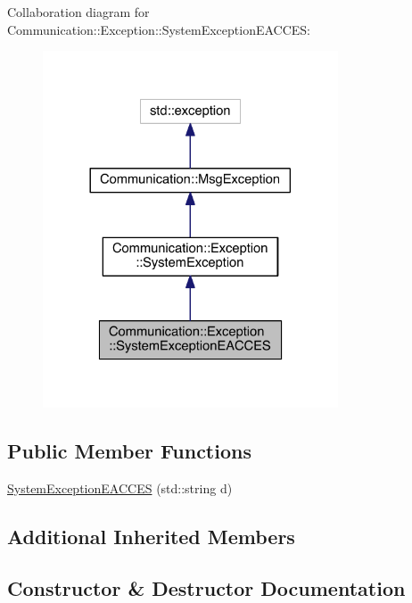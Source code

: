Collaboration diagram for Communication\+:\+:Exception\+:\+:System\+Exception\+E\+A\+C\+C\+E\+S\+:\nopagebreak
\begin{figure}[H]
\begin{center}
\leavevmode
\includegraphics[width=248pt]{class_communication_1_1_exception_1_1_system_exception_e_a_c_c_e_s__coll__graph}
\end{center}
\end{figure}
\subsection*{Public Member Functions}
\begin{DoxyCompactItemize}
\item 
\hyperlink{class_communication_1_1_exception_1_1_system_exception_e_a_c_c_e_s_a780c811acc8f4a2e3dcfe489e2e3875b}{System\+Exception\+E\+A\+C\+C\+E\+S} (std\+::string d)
\end{DoxyCompactItemize}
\subsection*{Additional Inherited Members}


\subsection{Constructor \& Destructor Documentation}
\hypertarget{class_communication_1_1_exception_1_1_system_exception_e_a_c_c_e_s_a780c811acc8f4a2e3dcfe489e2e3875b}{}
